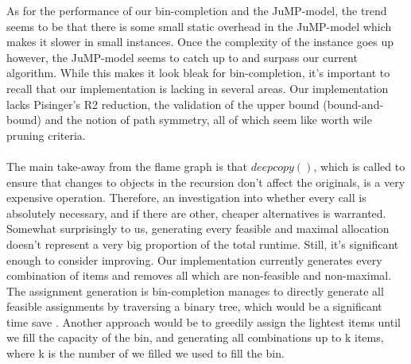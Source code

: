 \documentclass[b5paper]{article}
\begin{document}
As for the performance of our bin-completion and the JuMP-model, the trend seems to be that there is some small static overhead in the JuMP-model which makes it slower in small instances.
Once the complexity of the instance goes up however, the JuMP-model seems to catch up to and surpass our current algorithm.
While this makes it look bleak for bin-completion, it's important to recall that our implementation is lacking in several areas.
Our implementation lacks Pisinger's R2 reduction, the validation of the upper bound (bound-and-bound) and the notion of path symmetry, all of which seem like worth wile pruning criteria.
\\ \\
The main take-away from the flame graph is that $deepcopy()$, which is called to ensure that changes to objects in the recursion don't affect the originals, is a very expensive operation.
Therefore, an investigation into whether every call is absolutely necessary, and if there are other, cheaper alternatives is warranted.
Somewhat surprisingly to us, generating every feasible and maximal allocation doesn't represent a very big proportion of the total runtime.
Still, it's significant enough to consider improving. Our implementation currently generates every combination of items and removes all which are non-feasible and non-maximal.
The assignment generation is bin-completion manages to directly generate all feasible assignments by traversing a binary tree, which would be a significant time save \cite{fukunaga_bin_2007}.
Another approach would be to greedily assign the lightest items until we fill the capacity of the bin, and generating all combinations up to k items, where k is the number of we filled we used to fill the bin.
\end{document}
